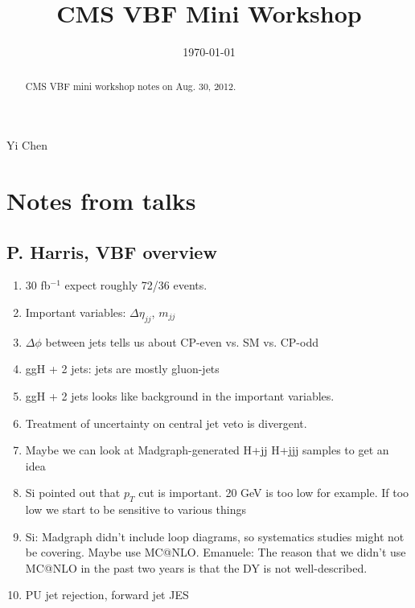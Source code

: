 \documentclass{fheadnote}
\begin{document}
\begin{titlepage}

   \date{\today}

   \title{CMS VBF Mini Workshop}

   \begin{Authlist}
      Yi Chen
   \end{Authlist}


   \begin{abstract}
      CMS VBF mini workshop notes on Aug. 30, 2012.
   \end{abstract}

\end{titlepage}

\setcounter{page}{2}

\section{Notes from talks}

\subsection{P. Harris, VBF overview}

\begin{enumerate}
\item 30 fb$^{-1}$ expect roughly 72/36 events.
\item Important variables: $\Delta \eta_{jj}$, $m_{jj}$
\item $\Delta \phi$ between jets tells us about CP-even vs. SM vs. CP-odd
\item ggH + 2 jets: jets are mostly gluon-jets
\item ggH + 2 jets looks like background in the important variables.
\item Treatment of uncertainty on central jet veto is divergent.
\item Maybe we can look at Madgraph-generated H+jj H+jjj samples to get an idea
\item Si pointed out that $p_T$ cut is important.  20 GeV is too low for example.
   If too low we start to be sensitive to various things
\item Si: Madgraph didn't include loop diagrams, so systematics studies might not be covering.
   Maybe use MC@NLO.
   Emanuele: The reason that we didn't use MC@NLO in the past two years is that the DY is not well-described.
\item PU jet rejection, forward jet JES
\end{enumerate}
\end{document}
